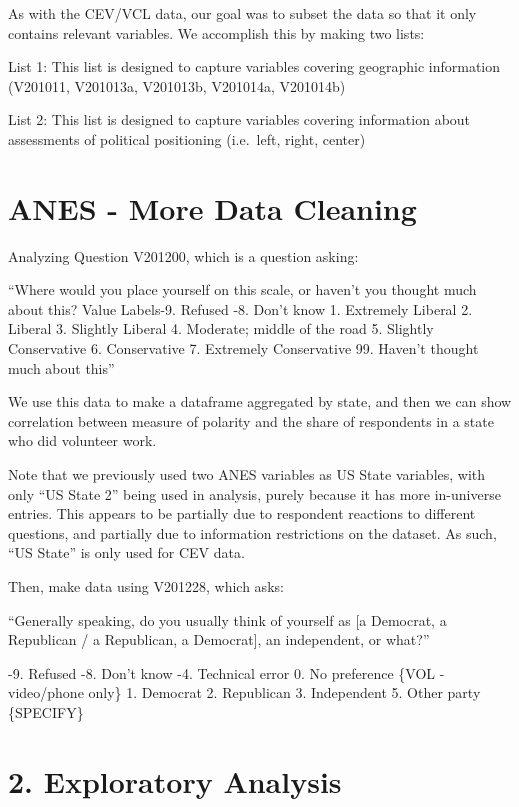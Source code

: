 \documentclass[
  letterpaper,
  DIV=11,
  numbers=noendperiod]{scrartcl}
\begin{document}
As with the CEV/VCL data, our goal was to subset the data so that it
only contains relevant variables. We accomplish this by making two
lists:

List 1: This list is designed to capture variables covering geographic
information (V201011, V201013a, V201013b, V201014a, V201014b)

List 2: This list is designed to capture variables covering information
about assessments of political positioning (i.e.~left, right, center)

\section{ANES - More Data Cleaning}\label{anes---more-data-cleaning}

Analyzing Question V201200, which is a question asking:

``Where would you place yourself on this scale, or haven't you thought
much about this? Value Labels-9. Refused -8. Don't know 1. Extremely
Liberal 2. Liberal 3. Slightly Liberal 4. Moderate; middle of the road
5. Slightly Conservative 6. Conservative 7. Extremely Conservative 99.
Haven't thought much about this''

We use this data to make a dataframe aggregated by state, and then we
can show correlation between measure of polarity and the share of
respondents in a state who did volunteer work.

Note that we previously used two ANES variables as US State variables,
with only ``US State 2'' being used in analysis, purely because it has
more in-universe entries. This appears to be partially due to respondent
reactions to different questions, and partially due to information
restrictions on the dataset. As such, ``US State'' is only used for CEV
data.

Then, make data using V201228, which asks:

``Generally speaking, do you usually think of yourself as {[}a Democrat,
a Republican / a Republican, a Democrat{]}, an independent, or what?''

-9. Refused -8. Don't know -4. Technical error 0. No preference \{VOL -
video/phone only\} 1. Democrat 2. Republican 3. Independent 5. Other
party \{SPECIFY\}

\section{2. Exploratory Analysis}\label{exploratory-analysis}
\end{document}
